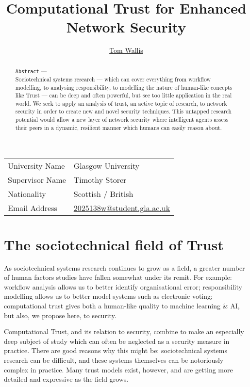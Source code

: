 \documentclass{tufte-handout}
\title{Computational Trust for Enhanced Network Security}
\author[Tom Wallis]{\href{http://tomwallis.net}{Tom Wallis}}
\date{}  %
\begin{document}
\maketitle%

\bigskip

\begin{tabular}{l l}
    University Name & Glasgow University\\
    Supervisor Name & Timothy Storer \\
    Nationality & Scottish / British \\
    Email Address & \href{mailto:2025138w@student.gla.ac.uk}{2025138w@student.gla.ac.uk} \\
\end{tabular}

\bigskip

\begin{abstract}
\texttt{Abstract} ---\\
Sociotechnical systems research --- which can cover everything from workflow modelling, to analysing responsibility, to modelling the nature of human-like concepts like Trust --- can be deep and often powerful, but see too little application in the real world. We seek to apply an analysis of trust, an active topic of research, to network security in order to create new and novel security techniques. This untapped research potential would allow a new layer of network security where intelligent agents assess their peers in a dynamic, resilient manner which humans can easily reason about.
\end{abstract}

\newpage

\section{The sociotechnical field of Trust}
As sociotechnical systems research continues to grow as a field, a greater number of human factors studies have fallen somewhat under its remit. For example: workflow analysis allows us to better identify organisational error; responsibility modelling allows us to better model systems such as electronic voting; computational trust gives both a human-like quality to machine learning \& AI, but also, we propose here, to security.\par

Computational Trust, and its relation to security, combine to make an especially deep subject of study which can often be neglected as a security measure in practice. There are good reasons why this might be: sociotechnical systems research can be difficult, and these systems themselves can be notoriously complex in practice.\cite{Crabtree2000} Many trust models exist, however, and are getting more detailed and expressive as the field grows.\par
\end{document}
